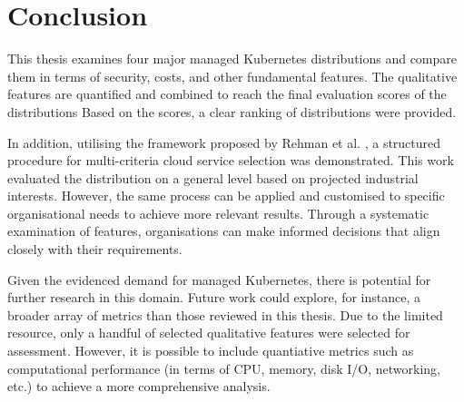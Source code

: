 \chapter{Conclusion}

This thesis examines four major managed Kubernetes distributions and compare them in terms of security, costs, and other fundamental features. The qualitative features are quantified and combined to reach the final evaluation scores of the distributions Based on the scores, a clear ranking of distributions were provided.

In addition, utilising the framework proposed by Rehman et al. \cite{5976164}, a structured procedure for multi-criteria cloud service selection was demonstrated. This work evaluated the distribution on a general level based on projected industrial interests. However, the same process can be applied and customised to specific organisational needs to achieve more relevant results. Through a systematic examination of features, organisations can make informed decisions that align closely with their requirements.

Given the evidenced demand for managed Kubernetes, there is potential for further research in this domain. Future work could explore, for instance, a broader array of metrics than those reviewed in this thesis. Due to the limited resource, only a handful of selected qualitative features were selected for assessment. However, it is possible to include quantiative metrics such as computational performance (in terms of CPU, memory, disk I/O, networking, etc.) to achieve a more comprehensive analysis.





















